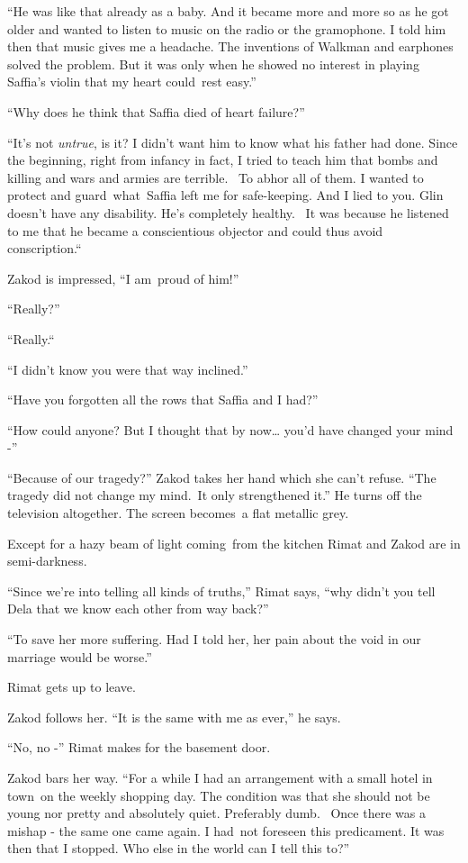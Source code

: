 \documentclass[twoside,11pt]{book}
\begin{document}
``He was like that already as a baby. And it became more and more so as he got older and wanted to listen
to music on the radio or the gramophone. I told him then that music gives me a headache. The inventions of Walkman and
earphones solved the problem. But it was only when he showed no interest in playing Saffia's violin that my heart
could\ rest easy.'' 

``Why does he think that Saffia died of heart failure?'' ~

``It's not\textit{ untrue}, is it? I didn't want him to know what his father had done. Since the beginning,
right from infancy in fact, I tried to teach him that bombs and killing and wars and armies are terrible.~ To abhor all
of them. I wanted to protect and guard~what~Saffia left me for safe-keeping. And I lied to you. Glin doesn't have any
disability. He's completely healthy. ~It was because he listened to me that he became a conscientious objector and
could thus avoid conscription.``{\ }

Zakod is impressed, ``I am\ proud of him!'' 

``Really?'' 

``Really.``~ 

``I didn't know you were that way inclined.'' 

``Have you forgotten all the rows that Saffia and I had?'' 

``How could anyone?  But I thought that by now{\dots} you'd have changed your mind -''

``Because of our tragedy?'' Zakod takes her hand which she can't refuse. ``The
tragedy did not change my mind.\ It only strengthened it.'' He turns off the television altogether. The
screen becomes~a flat metallic grey.

Except for a hazy beam of light coming{\ }from the kitchen Rimat and
Zakod are in semi-darkness. 

``Since we're into telling all kinds of truths,'' Rimat says, ``why didn't you
tell Dela that we know each other from way back?'' 

``To save her more suffering. Had I told her, her pain about the void in our marriage would be
worse.'' 

Rimat gets up to leave.

Zakod follows her. ``It is the same with me as ever,'' he says. 

``No, no -'' Rimat makes for the basement door. 

Zakod bars her way. ``For a while I had an arrangement with a small hotel in town\ on the weekly shopping
day. The condition was that she should not be young nor pretty and absolutely quiet. Preferably dumb. ~Once there was a
mishap - the same one came again. I had\ not foreseen this predicament. It was then that I stopped. Who else in the
world can I tell this to?'' 
\end{document}
